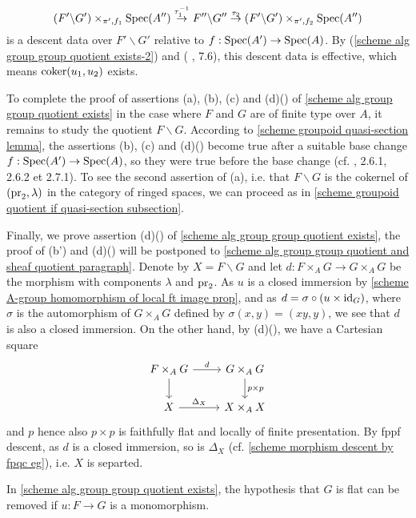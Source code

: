 \[(F'\backslash G')\times_{\pi',f_1}\mathrm{Spec}(A'')\stackrel{\tau_1^{-1}}{\to} F''\backslash G''\stackrel{\tau_2}{\to} (F'\backslash G')\times_{\pi',f_2}\mathrm{Spec}(A'')\]
is a descent data over $F'\backslash G'$ relative to $f:\mathrm{Spec}(A')\to\mathrm{Spec}(A)$. By (\ref{scheme alg group group quotient exists-2}) and (\cite{SGA1} , 7.6), this descent data is effective, which means $\operatorname{coker}(u_1,u_2)$ exists.\par
To complete the proof of assertions (a), (b), (c) and (d)() of \cref{scheme alg group group quotient exists} in the case where $F$ and $G$ are of finite type over $A$, it remains to study the quotient $F\backslash G$. According to \cref{scheme groupoid quasi-section lemma}, the assertions (b), (c) and (d)() become true after a suitable base change $f:\mathrm{Spec}(A')\to\mathrm{Spec}(A)$, so they were true before the base change (cf. \cite{EGA4-2}, 2.6.1, 2.6.2 et 2.7.1). To see the second assertion of (a), i.e. that $F\backslash G$ is the cokernel of $(\mathrm{pr}_2,\lambda)$ in the category of ringed spaces, we can proceed as in  \ref{scheme groupoid quotient if quasi-section subsection}.\par
Finally, we prove assertion (d)() of \cref{scheme alg group group quotient exists}, the proof of (b') and (d)() will be postponed to \ref{scheme alg group group quotient and sheaf quotient paragraph}. Denote by $X=F\backslash G$ and let $d:F\times_AG\to G\times_AG$ be the morphism with components $\lambda$ and $\mathrm{pr}_2$. As $u$ is a closed immersion by \cref{scheme A-group homomorphism of local ft image prop}, and as $d=\sigma\circ(u\times\operatorname{id}_G)$, where $\sigma$ is the automorphism of $G\times_AG$ defined by $\sigma(x,y)=(xy,y)$, we see that $d$ is also a closed immersion. On the other hand, by (d)(), we have a Cartesian square
\[\begin{tikzcd}
F\times_AG\ar[r,"d"]\ar[d]&G\times_AG\ar[d,"p\times p"]\\
X\ar[r,"\Delta_X"]&X\times_AX
\end{tikzcd}\]
and $p$ hence also $p\times p$ is faithfully flat and locally of finite presentation. By fppf descent, as $d$ is a closed immersion, so is $\Delta_X$ (cf. \cref{scheme morphism descent by fpqc eg}), i.e. $X$ is separted.

\begin{remark}\label{scheme alg group monomorphism from flat group quotient exists}
In \cref{scheme alg group group quotient exists}, the hypothesis that $G$ is flat can be removed if $u:F\to G$ is a monomorphism.
\end{remark}

